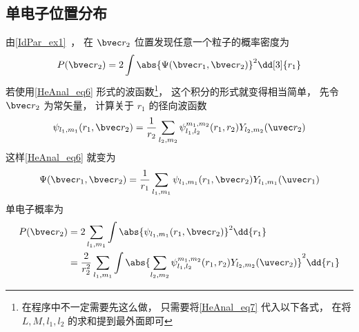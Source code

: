 \subsection{单电子位置分布}
由\autoref{IdPar_ex1}~， 在 $\bvec r_2$ 位置发现任意一个粒子的概率密度为
\begin{equation}
P(\bvec r_2) = 2\int \abs{\Psi(\bvec r_1, \bvec r_2)}^2 \dd[3]{r_1}
\end{equation}
若使用\autoref{HeAnal_eq6} 形式的波函数\footnote{在程序中不一定需要先这么做， 只需要将\autoref{HeAnal_eq7} 代入以下各式， 在将 $L, M, l_1, l_2$ 的求和提到最外面即可}， 这个积分的形式就变得相当简单， 先令 $\bvec r_2$ 为常矢量， 计算关于 $r_1$ 的径向波函数
\begin{equation}\label{HeAnal_eq15}
\psi_{l_1, m_1}(r_1, \bvec r_2) = \frac{1}{r_2} \sum_{l_2, m_2} \psi_{l_1, l_2}^{m_1, m_2}(r_1, r_2) Y_{l_2, m_2}(\uvec r_2)
\end{equation}
这样\autoref{HeAnal_eq6} 就变为
\begin{equation}
\Psi(\bvec r_1, \bvec r_2) = \frac{1}{r_1} \sum_{l_1, m_1} \psi_{l_1, m_1}(r_1, \bvec r_2) Y_{l_1, m_1} (\uvec r_1)
\end{equation}
单电子概率为
\begin{equation}
\begin{aligned}
P(\bvec r_2) &= 2\sum_{l_1, m_1} \int \abs{\psi_{l_1, m_1}(r_1, \bvec r_2)}^2 \dd{r_1}\\
& = \frac{2}{r_2^2} \sum_{l_1, m_1} \int \abs{\sum_{l_2, m_2} \psi_{l_1, l_2}^{m_1, m_2}(r_1, r_2) Y_{l_2,m_2}(\uvec r_2)}^2 \dd{r_1}
\end{aligned}
\end{equation}

